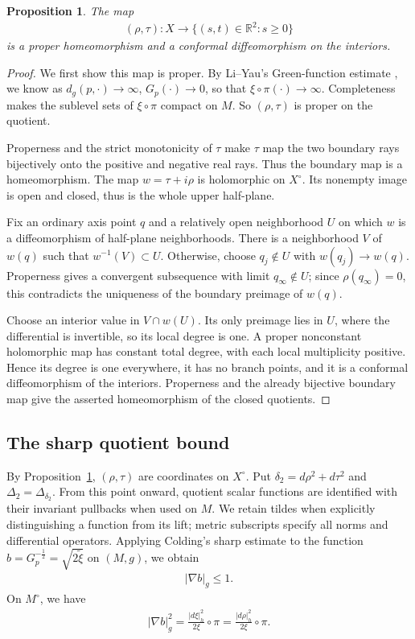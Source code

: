 \documentclass[letterpaper]{amsart}
\newtheorem{prop}[thm]{Proposition}
\theoremstyle{definition}
\theoremstyle{remark}
\begin{document}
\begin{prop}\label{prop-weyl}
		The map
	\begin{align*}
		(\rho , \tau ): X \to \{ (s,t) \in \mathbb{R}^2: s \geq 0\} 
	\end{align*}
	is a proper homeomorphism and a conformal diffeomorphism on the interiors.
\end{prop}
\begin{proof}
	We first show this map is proper. By Li--Yau's Green-function estimate \cite[Theorem~5.2]{notes-LiYau}, we know as $d_{g}(p, \cdot ) \to \infty$, $G_{p} (\cdot ) \to 0$, so that $\xi \circ \pi (\cdot ) \to \infty$. Completeness makes the sublevel sets of $\xi\circ \pi  $ compact on $M$. So $(\rho , \tau ) $ is proper on the quotient.

	Properness and the strict monotonicity of $\tau $ make $\tau $ map the two boundary rays bijectively onto the positive and negative real rays. Thus the boundary map is a homeomorphism. The map $w = \tau + i \rho $ is holomorphic on $X ^{\circ}$. Its nonempty image is open and closed, thus is the whole upper half-plane. 

	Fix an ordinary axis point $q$ and a relatively open neighborhood $U$ on which $w$ is a diffeomorphism of half-plane neighborhoods. There is a neighborhood $V$ of $w(q)$ such that $w^{-1}(V)\subset U$. Otherwise, choose $q_j\notin U$ with $w(q_j)\to w(q)$. Properness gives a convergent subsequence with limit $q_\infty\notin U$; since $\rho(q_\infty)=0$, this contradicts the uniqueness of the boundary preimage of $w(q)$.

Choose an interior value in $V\cap w(U)$. Its only preimage lies in $U$, where the differential is invertible, so its local degree is one. A proper nonconstant holomorphic map has constant total degree, with each local multiplicity positive. Hence its degree is one everywhere, it has no branch points, and it is a conformal diffeomorphism of the interiors. Properness and the already bijective boundary map give the asserted homeomorphism of the closed quotients.
\end{proof}

\subsection{The sharp quotient bound}\label{subsec-quotient-bound}
By Proposition~\ref{prop-weyl}, $(\rho,\tau)$ are coordinates on $X^\circ$.
Put $\delta_2=d\rho^2+d\tau^2$ and $\Delta_2=\Delta_{\delta_2}$.
From this point onward, quotient scalar functions are identified with their
invariant pullbacks when used on $M$. We retain tildes when explicitly
distinguishing a function from its lift; metric subscripts specify all
norms and differential operators.
Applying Colding's sharp estimate \cite[Theorem~3.1]{notes-Colding} to the function $b = G_{p} ^{-\frac{1}{2}} = \sqrt{2 \tilde{\xi }} $ on $(M, g)$, we obtain
\begin{align*}
	|\nabla b|_{g} \leq 1. 
\end{align*} 
On $M ^{\circ}$, we have
\begin{align*}
	|\nabla b|^2_g = \frac{|d \xi |^2_h}{2 \xi } \circ \pi  = \frac{|d \rho |^2_h}{2 \xi }\circ \pi .
\end{align*} 
\end{document}
